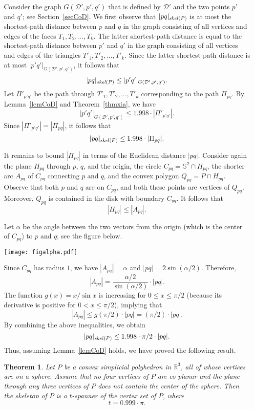 \documentclass[12pt]{article}
\newtheorem{theorem}{Theorem}
\newcommand{\IR}{\mathbb{R}}
\newcommand{\IS}{\mathbb{S}}
\newcommand{\skel}{\mathord{\it skel}}
\begin{document}
Consider the graph $G(\mathcal{D'},p',q')$ that is defined by 
$\mathcal{D'}$ and the two points $p'$ and $q'$; see 
Section~\ref{secCoD}. We first observe that $|pq|_{\skel(P)}$ is at most 
the shortest-path distance between $p$ and $q$ in the graph consisting 
of all vertices and edges of the faces $T_1,T_2,\ldots,T_k$. The latter 
shortest-path distance is equal to the shortest-path distance between 
$p'$ and $q'$ in the graph consisting of all vertices and edges of the 
triangles $T'_1,T'_2,\ldots,T'_k$. Since the latter shortest-path 
distance is at most $|p'q'|_{G(\mathcal{D'},p',q')}$, it follows that 
\[ |pq|_{\skel(P)} \leq |p'q'|_{G(\mathcal{D'},p',q')} . 
\] 
Let $\Pi'_{p'q'}$ be the path through $T'_1,T'_2,\ldots,T'_k$ 
corresponding to the path $\Pi_{pq}$. By Lemma~\ref{lemCoD} and 
Theorem~\ref{thmxia}, we have 
\[ |p'q'|_{G(\mathcal{D'},p',q')} \leq 1.998 \cdot |\Pi'_{p'q'}| . 
\]
Since $|\Pi'_{p'q'}| = |\Pi_{pq}|$, it follows that 
\[ |pq|_{\skel(P)} \leq 1.998 \cdot |\Pi_{pq}| . 
\] 

It remains to bound $|\Pi_{pq}|$ in terms of the Euclidean distance 
$|pq|$. Consider again the plane $H_{pq}$ through $p$, $q$, and the 
origin, the circle $C_{pq} = \IS^2 \cap H_{pq}$, the shorter arc 
$A_{pq}$ of $C_{pq}$ connecting $p$ and $q$, and the convex polygon 
$Q_{pq} = P \cap H_{pq}$. Observe that both $p$ and $q$ are on $C_{pq}$, 
and both these points are vertices of $Q_{pq}$. Moreover, $Q_{pq}$ is 
contained in the disk with boundary $C_{pq}$. It follows that 
\[ |\Pi_{pq}| \leq |A_{pq}| . 
\] 

Let $\alpha$ be the angle between the two vectors from the 
origin (which is the center of $C_{pq}$) to $p$ and $q$; see the figure 
below. 

\begin{center}
\texttt{[image: figalpha.pdf]}
\end{center}

Since $C_{pq}$ has radius $1$, we have $|A_{pq}| = \alpha$ and 
$|pq| = 2 \sin (\alpha/2)$. Therefore, 
\[ |A_{pq}| = \frac{\alpha/2}{\sin (\alpha/2)} \cdot |pq| .
\]
The function $g(x) = x/\sin x$ is increasing for $0 \leq x \leq \pi/2$ 
(because its derivative is positive for $0 < x \leq \pi/2$), implying 
that
\[ |A_{pq}| \leq g(\pi/2) \cdot |pq| = (\pi/2) \cdot |pq| .
\]
By combining the above inequalities, we obtain 
\[ |pq|_{\skel(P)} \leq 1.998 \cdot \pi/2 \cdot |pq| . 
\]
Thus, assuming Lemma~\ref{lemCoD} holds, we have proved the following 
result. 

\begin{theorem}   \label{thm999}  
Let $P$ be a convex simplicial polyhedron in $\IR^3$, all of whose 
vertices are on a sphere. Assume that no four vertices of $P$ are 
co-planar and the plane through any three vertices of $P$ does not 
contain the center of the sphere. Then the skeleton of $P$ is a 
$t$-spanner of the vertex set of $P$, where 
\[ t = 0.999 \cdot \pi .
\] 
\end{theorem} 
\end{document}
